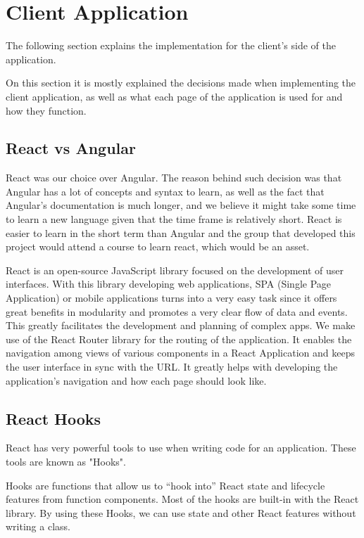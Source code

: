\documentclass[a4paper,twoside,10pt]{report}
\begin{document}
\chapter{Client Application}
The following section explains the implementation for the client’s side of the application. 

On this section it is mostly explained the decisions made when implementing the client application, as well as what each page of the application is used for and how they function.
 
\section{React vs Angular}
React was our choice over Angular. The reason behind such decision was that Angular has a lot of concepts and syntax to learn, as well as the fact that Angular's documentation is much longer, and we believe it might take some time to learn a new language given that the time frame is relatively short. React is easier to learn in the short term than Angular and the group that developed this project would attend a course to learn react, which would be an asset.

React is an open-source JavaScript library focused on the development of user interfaces. With this library developing web applications, SPA (Single Page Application) or mobile applications turns into a very easy task since it offers great benefits in modularity and promotes a very clear flow of data and events. This greatly facilitates the development and planning of complex apps.
We make use of the React Router library for the routing of the application. It enables the navigation among views of various components in a React Application and keeps the user interface in sync with the URL. It greatly helps with developing the application's navigation and how each page should look like.

\section{React Hooks}
React has very powerful tools to use when writing code for an application. These tools are known as "Hooks".

Hooks are functions that allow us to “hook into” React state and lifecycle features from function components. Most of the hooks are built-in with the React library. By using these Hooks, we can use state and other React features without writing a class.
\end{document}
